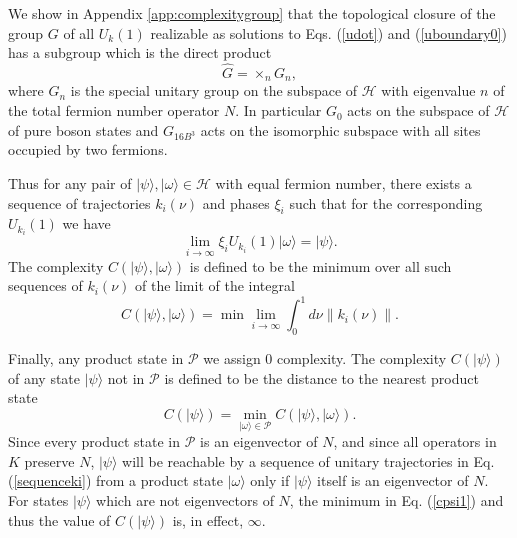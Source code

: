 \documentclass[12pt,amsmath,amssymb,onecolumn]{revtex4-2}
\begin{document}
We show in Appendix \ref{app:complexitygroup}
that the topological closure of the group $G$ of all $U_k( 1)$ realizable as solutions to Eqs. (\ref{udot}) and
(\ref{uboundary0}) has a subgroup which is the direct product
\begin{equation}
\label{formofg}
\hat{G} = \times_n G_n,
\end{equation}
where $G_n$ is the special unitary group on the subspace of $\mathcal{H}$
with eigenvalue $n$ of the total fermion number operator $N$.
In particular $G_0$ acts on the subspace of $\mathcal{H}$ of
pure boson states and $G_{16 B^3}$ acts on the
isomorphic subspace with all sites occupied by two fermions.



Thus for any pair of $|\psi \rangle , |\omega \rangle  \in \mathcal{H}$ with equal
fermion number, there 
exists a sequence of trajectories $k_i(\nu)$ and phases $\xi_i$ such that for the corresponding
$U_{k_i}(1)$ we have
\begin{equation}
\label{sequenceki}
\lim_{i \rightarrow \infty} \xi_i U_{k_i}(1) |\omega \rangle  = |\psi \rangle .
\end{equation}
The complexity $C(|\psi \rangle , |\omega \rangle )$ is defined to be the minimum 
over all such sequences of $k_i(\nu)$ of the
limit of the integral
\begin{equation}
\label{complexity}
C(| \psi \rangle , |\omega \rangle ) = \min \lim_{i \rightarrow \infty} \int_0^1 d \nu \parallel k_i( \nu) \parallel. 
\end{equation}

Finally, any product state in $\mathcal{P}$ we assign 0 complexity. 
The complexity $C( |\psi \rangle )$ of any state $|\psi \rangle $ not in $\mathcal{P}$
is defined to be the distance to the nearest product state
\begin{equation}
\label{cpsi1}
C( |\psi \rangle ) = \min_{|\omega \rangle  \in \mathcal{P}} C(| \psi \rangle , |\omega \rangle ).
\end{equation}
Since every product state in $\mathcal{P}$ is an eigenvector of $N$,
and since all operators in $K$ preserve $N$,  $|\psi \rangle $ will be reachable by
a sequence of unitary trajectories in Eq. (\ref{sequenceki}) from a product
state $|\omega \rangle $ only if $|\psi \rangle $ itself is an eigenvector of $N$.
For states $|\psi \rangle $ which are not eigenvectors of $N$, the minimum
in Eq. (\ref{cpsi1}) and thus the value of $C(|\psi \rangle )$ is, in effect, $\infty$.
\end{document}
